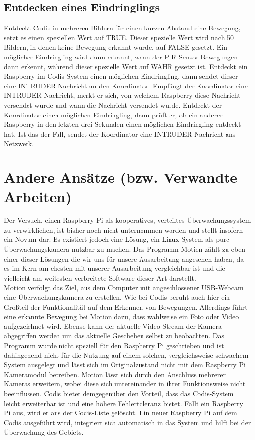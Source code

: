 \documentclass[journal]{IEEEtran}
\begin{document}
\subsection{Entdecken eines Eindringlings}

Entdeckt Codis in mehreren Bildern für einen kurzen Abstand eine Bewegung, setzt es einen speziellen Wert auf TRUE. Dieser spezielle Wert wird nach 50 Bildern, in denen keine Bewegung erkannt wurde, auf FALSE gesetzt. Ein möglicher Eindringling wird dann erkannt, wenn der PIR-Sensor Bewegungen dann erkennt, während dieser spezielle Wert auf WAHR gesetzt ist. Entdeckt ein Raspberry im Codis-System einen möglichen Eindringling, dann sendet dieser eine \MakeUppercase{intruder} Nachricht an den Koordinator. Empfängt der Koordinator eine \MakeUppercase{intruder} Nachricht, merkt er sich, von welchem Raspberry diese Nachricht versendet wurde und wann die Nachricht versendet wurde. Entdeckt der Koordinator einen möglichen Eindringling, dann prüft er, ob ein anderer Raspberry in den letzten drei Sekunden einen möglichen Eindringling entdeckt hat. Ist das der Fall, sendet der Koordinator eine \MakeUppercase{intruder} Nachricht ans Netzwerk.

\section{Andere Ansätze (bzw. Verwandte Arbeiten)}
Der Versuch, einen Raspberry Pi als kooperatives, verteiltes Überwachungssystem zu verwirklichen, ist bisher noch nicht unternommen worden und stellt insofern ein Novum dar. Es existiert jedoch eine Lösung, ein Linux-System als pure Überwachungskamera nutzbar zu machen. Das Programm Motion \cite{motion} zählt zu eben einer dieser Lösungen die wir uns für unsere Ausarbeitung angesehen haben, da es im Kern am ehesten mit unserer Ausarbeitung vergleichbar ist und die vielleicht am weitesten verbreitete Software dieser Art darstellt. \\Motion verfolgt das Ziel, aus dem Computer mit angeschlossener USB-Webcam eine Überwachungskamera zu erstellen. Wie bei Codis beruht auch hier ein Großteil der Funktionalität auf dem Erkennen von Bewegungen. Allerdings führt eine erkannte Bewegung bei Motion dazu, dass wahlweise ein Foto oder Video aufgezeichnet wird. Ebenso kann der aktuelle Video-Stream der Kamera abgegriffen werden um das aktuelle Geschehen selbst zu beobachten. Das Programm wurde nicht speziell für den Raspberry Pi geschrieben und ist dahingehend nicht für die Nutzung auf einem solchen, vergleichsweise schwachem System ausgelegt und lässt sich im Originalzustand nicht mit dem Raspberry Pi Kameramodul betreiben. Motion lässt sich durch den Anschluss mehrerer Kameras erweitern, wobei diese sich untereinander in ihrer Funktionsweise nicht beeinflussen. Codis bietet demgegenüber den Vorteil, dass das Codis-System leicht erweiterbar ist und eine höhere Fehlertoleranz bietet. Fällt ein Raspberry Pi aus, wird er aus der Codis-Liste gelöscht. Ein neuer Raspberry Pi auf dem Codis ausgeführt wird, integriert sich automatisch in das System und hilft bei der Überwachung des Gebiets.
\end{document}
